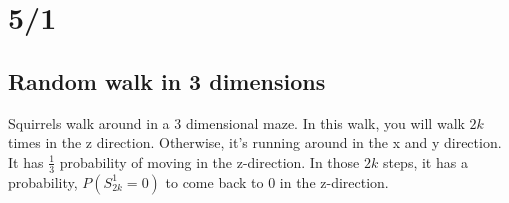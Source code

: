 \section*{5/1}
  \subsection*{Random walk in 3 dimensions}
    Squirrels walk around in a 3 dimensional maze. In this walk, you will walk
    $2k$ times in the z direction. Otherwise, it's running around in the x and
    y direction.\\

    It has $\frac{1}{3}$ probability of moving in the z-direction. In those $2k$ 
    steps, it has a probability, $P(S_{2k}^1 = 0)$ to come back to 0 in the 
    z-direction. \\

